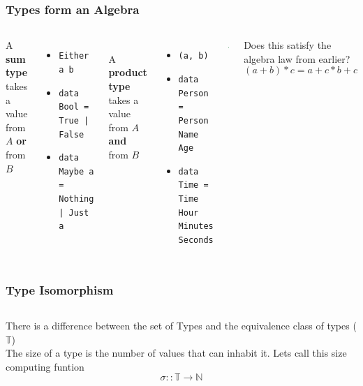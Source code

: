 \documentclass[10pt]{beamer}
\newcommand{\hrsmall}{\noindent\makebox[\linewidth]{\rule{.3\paperwidth}{0.4pt}} \\}
\begin{document}
\begin{frame}[fragile]
    \frametitle{Types form an Algebra}
    \begin{columns} %
    A \textbf{sum type} takes a value from $A$ \textbf{or} from $B$
    \begin{itemize}
        \item \texttt{Either a b}
        \item \texttt{data Bool = True | False}
        \item \texttt{data Maybe a \\
    = Nothing | Just a}
    \end{itemize}
    \hrsmall
    A \textbf{product type} takes a value from $A$ \textbf{and} from $B$
    \begin{itemize}
        \item \texttt{(a, b)}
        \item \texttt{data Person = Person Name Age}
        \item \texttt{data Time = Time Hour Minutes Seconds}
    \end{itemize}


    \begin{lstlisting}[language=Haskell]
instance Algebra Type where
  zero = Void
  one  = ()
  (+)  = Either
  (*)  = (,)
    \end{lstlisting}
    
    Does this satisfy the algebra law from earlier? \\
    $$(a+b)*c = a+c * b+c$$

    \end{columns}
\end{frame}
 

\begin{frame}[fragile]
    \frametitle{Type Isomorphism}
    \begin{columns} %
    There is a difference between the set of Types and the equivalence class of types ($\mathbb{T}$)
    \hrsmall
    The size of a type is the number of values that can inhabit it. Lets call this size computing funtion
    $$ \sigma :: \mathbb{T} \rightarrow \mathbb{N} $$


    \end{columns}
\end{frame}
\end{document}
